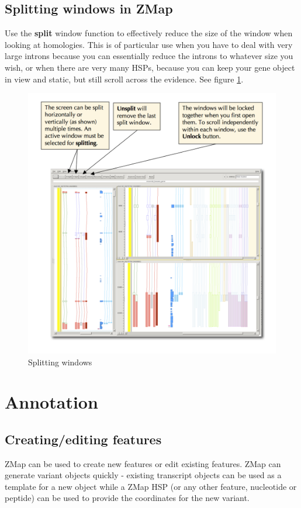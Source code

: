 \documentclass[letterpaper]{article}
\begin{document}
\subsection{Splitting windows in ZMap}
Use the \textbf{split} window function to effectively reduce the size of the window when looking at homologies. This is of particular use when you have to deal with very large introns because you can essentially reduce the introns to whatever size you wish, or when there are very many HSPs, because you can keep your gene object in view and static, but still scroll across the evidence. See figure \ref{img_split_window}.

\begin{figure}
\centering
\color[rgb]{0.30980393,0.5058824,0.7411765}
\includegraphics[width=15.231cm]{img_split_window.png}
\caption{Splitting windows}
\label{img_split_window}
\end{figure}


\clearpage
\section{Annotation}

\subsection{Creating/editing features}
ZMap can be used to create new features or edit existing features. ZMap can generate variant objects quickly - existing transcript objects can be used as a template for a new object while a ZMap HSP (or any other feature, nucleotide or peptide) can be used to provide the coordinates for the new variant.
\end{document}
